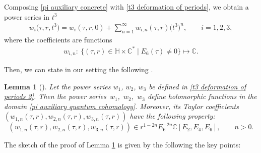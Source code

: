 \documentclass[11pt]{article}
\numberwithin{equation}{section}
\numberwithin{equation}{section}
\newtheorem{Lemma}[Theorem]{Lemma}
\begin{document}
Composing \eqref{pi auxiliary concrete} with \eqref{t3 deformation of periods}, we obtain a power series in \(t^3\)
\begin{gather}\label{t3 deformation of periods 2}
w_{i}\bigl(\tau,r,t^3\bigr) = w_i(\tau,r,0) + \sum_{n=1}^{\infty} w_{i,n}(\tau,r) \bigl( t^3 \bigr)^n, \qquad i=1,2,3,
\end{gather}
where the coefficients are functions
\begin{gather*}
w_{i,n}\colon\ \{(\tau,r) \in \mathbb{H} \times \mathbb{C}^{*} \mid E_6(\tau) \neq 0\} \mapsto \mathbb{C}.
\end{gather*}

Then, we can state in our setting the following \cite[Proposition 5.8]{Milanov}.

\begin{Lemma}[{\cite{Milanov}}]\label{lemma Milanov deformation 1}
Let the power series $w_1$, $w_2$, $w_3$ be defined in \eqref{t3 deformation of periods 2}. Then the power series~$w_1$,~$w_2$,~$w_3$ define holomorphic functions in the domain \eqref{pi auxiliary quantum cohomology}.
 Moreover, its Taylor coefficients $(w_{1,n}(\tau,r),w_{2,n}(\tau,r),w_{3,n}(\tau,r))$ have the following property:
\[%
(w_{1,n}(\tau,r),w_{2,n}(\tau,r),w_{3,n}(\tau,r)) \in r^{1-2n}E_6^{-2n}\mathbb{C}[ E_2,E_4,E_6], \qquad n>0 .
\]
\end{Lemma}
The sketch of the proof of Lemma \ref{lemma Milanov deformation 1} is given by the following the key points:
\end{document}
